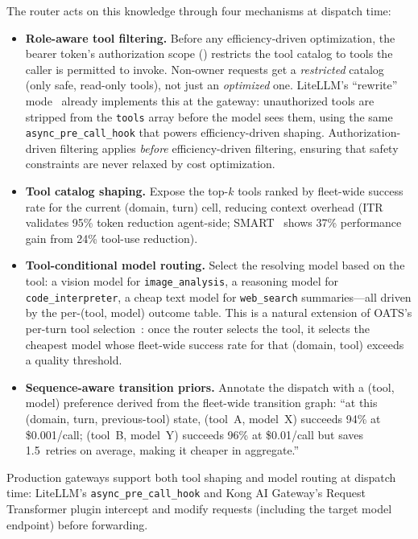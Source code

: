 \begin{opportunity}
The router acts on this knowledge through four mechanisms at
dispatch time:
\begin{itemize}[nosep]
  \item \textbf{Role-aware tool filtering.}
        Before any efficiency-driven optimization, the bearer
        token's authorization scope
        () restricts the tool catalog
        to tools the caller is permitted to invoke.  Non-owner
        requests get a \emph{restricted} catalog (only safe,
        read-only tools), not just an \emph{optimized} one.
        LiteLLM's ``rewrite'' mode~\cite{litellm2026toolguard}
        already implements this at the gateway: unauthorized tools
        are stripped from the \texttt{tools} array before the model
        sees them, using the same
        \texttt{async\_pre\_call\_hook}
        that powers efficiency-driven shaping.
        Authorization-driven filtering applies \emph{before}
        efficiency-driven filtering, ensuring that safety constraints
        are never relaxed by cost optimization.
  \item \textbf{Tool catalog shaping.}  Expose the top-$k$ tools
        ranked by fleet-wide success rate for the current (domain,
        turn) cell, reducing context overhead (ITR~\cite{itr2026}
        validates 95\% token reduction agent-side;
        SMART~\cite{smart2026} shows 37\% performance gain from
        24\% tool-use reduction).
  \item \textbf{Tool-conditional model routing.}  Select the
        resolving model based on the tool: a vision model for
        \texttt{image\_analysis}, a reasoning model for
        \texttt{code\_interpreter}, a cheap text model for
        \texttt{web\_search} summaries---all driven by the
        per-(tool, model) outcome table.  This is a natural extension
        of OATS's per-turn tool selection~\cite{oats2026}: once the
        router selects the tool, it selects the cheapest model whose
        fleet-wide success rate for that (domain, tool) exceeds a
        quality threshold.
  \item \textbf{Sequence-aware transition priors.}
        Annotate the dispatch with a (tool, model) preference derived
        from the fleet-wide transition graph: ``at this (domain,
        turn, previous-tool) state, (tool~A, model~X) succeeds 94\%
        at \$0.001/call; (tool~B, model~Y) succeeds 96\% at
        \$0.01/call but saves 1.5~retries on average, making it
        cheaper in aggregate.''
\end{itemize}
Production gateways support both tool shaping and model routing at
dispatch time: LiteLLM's \texttt{async\_pre\_call\_hook} and Kong AI
Gateway's Request Transformer plugin intercept and modify requests
(including the target model endpoint) before forwarding.


\end{opportunity}
